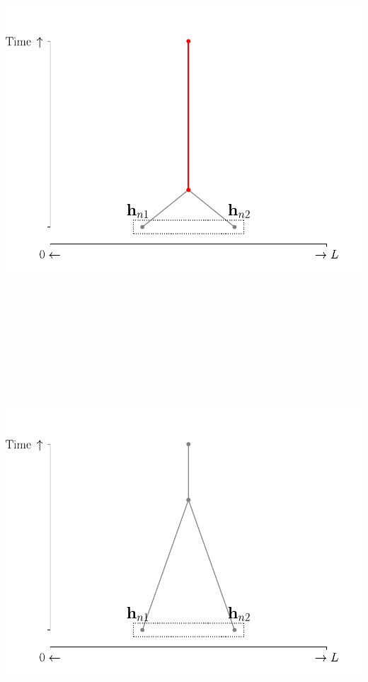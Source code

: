 \documentclass[
  letterpaper,
  DIV=11,
  numbers=noendperiod]{scrartcl}
\begin{document}
\begin{center}
\includegraphics[width=\linewidth,height=5.72917in,keepaspectratio]{slides_files/mediabag/imgs/covariance-short-1.pdf}
\end{center}

\begin{center}
\includegraphics[width=\linewidth,height=5.72917in,keepaspectratio]{slides_files/mediabag/imgs/covariance-long-0.pdf}
\end{center}
\end{document}
